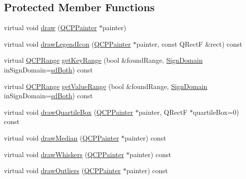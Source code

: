 \subsection*{Protected Member Functions}
\begin{DoxyCompactItemize}
\item 
virtual void \hyperlink{classQCPStatisticalBox_a753b62761217dd6b92f8a29e286a1317}{draw} (\hyperlink{classQCPPainter}{Q\+C\+P\+Painter} $\ast$painter)
\item 
virtual void \hyperlink{classQCPStatisticalBox_a51764ed423fa02d3ef63f6848851ec33}{draw\+Legend\+Icon} (\hyperlink{classQCPPainter}{Q\+C\+P\+Painter} $\ast$painter, const Q\+RectF \&rect) const 
\item 
virtual \hyperlink{classQCPRange}{Q\+C\+P\+Range} \hyperlink{classQCPStatisticalBox_ad700fdce0f456dd22a3679d61e9896a4}{get\+Key\+Range} (bool \&found\+Range, \hyperlink{classQCPAbstractPlottable_a661743478a1d3c09d28ec2711d7653d8}{Sign\+Domain} in\+Sign\+Domain=\hyperlink{classQCPAbstractPlottable_a661743478a1d3c09d28ec2711d7653d8a082b98cfb91a7363a3b5cd17b0c1cd60}{sd\+Both}) const 
\item 
virtual \hyperlink{classQCPRange}{Q\+C\+P\+Range} \hyperlink{classQCPStatisticalBox_adeef8c9a0361683c776bca2fbff292b7}{get\+Value\+Range} (bool \&found\+Range, \hyperlink{classQCPAbstractPlottable_a661743478a1d3c09d28ec2711d7653d8}{Sign\+Domain} in\+Sign\+Domain=\hyperlink{classQCPAbstractPlottable_a661743478a1d3c09d28ec2711d7653d8a082b98cfb91a7363a3b5cd17b0c1cd60}{sd\+Both}) const 
\item 
virtual void \hyperlink{classQCPStatisticalBox_a9ad0abdb154fefb04e9872f0db8e2ec7}{draw\+Quartile\+Box} (\hyperlink{classQCPPainter}{Q\+C\+P\+Painter} $\ast$painter, Q\+RectF $\ast$quartile\+Box=0) const 
\item 
virtual void \hyperlink{classQCPStatisticalBox_a16fef8bc19e5a09d82033edcfe919495}{draw\+Median} (\hyperlink{classQCPPainter}{Q\+C\+P\+Painter} $\ast$painter) const 
\item 
virtual void \hyperlink{classQCPStatisticalBox_a6f8d093ec7e404529388d02da4c72b34}{draw\+Whiskers} (\hyperlink{classQCPPainter}{Q\+C\+P\+Painter} $\ast$painter) const 
\item 
virtual void \hyperlink{classQCPStatisticalBox_a60ebb332a497f51ace837767db5105b9}{draw\+Outliers} (\hyperlink{classQCPPainter}{Q\+C\+P\+Painter} $\ast$painter) const 
\end{DoxyCompactItemize}

